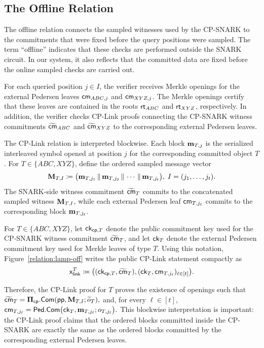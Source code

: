 \subsection{The Offline Relation}
\label{sec:openings-and-cplink}

The offline relation connects the sampled witnesses used by the
CP-SNARK to the commitments that were fixed before the query positions were
sampled.  The term ``offline'' indicates that these checks are performed outside the SNARK circuit. In our system, it also reflects that the committed data are fixed before the online sampled checks are carried out.

For each queried position \(j\in I\), the verifier receives Merkle openings for the external Pedersen leaves $\textsf{cm}_{ABC,j}$ and $\textsf{cm}_{XYZ,j}$.
The Merkle openings certify that these leaves are contained in the roots
\(\textsf{rt}_{ABC}\) and \(\textsf{rt}_{XYZ}\), respectively.  In addition, the verifier checks
CP-Link proofs connecting the CP-SNARK witness commitments
\(\widetilde{\textsf{cm}}_{ABC}\) and \(\widetilde{\textsf{cm}}_{XYZ}\) to the corresponding
external Pedersen leaves.

The CP-Link relation is interpreted blockwise.  Each block
\(\mathbf{m}_{T,j}\) is the serialized interleaved symbol opened at position
\(j\) for the corresponding committed object \(T\).  For
\(T\in\{ABC,XYZ\}\), define the ordered sampled message vector
\[
  \mathbf{M}_{T,I}
  \coloneqq
  \big(
    \mathbf{m}_{T,j_1}
    \,\|\,
    \mathbf{m}_{T,j_2}
    \,\|\,
    \cdots
    \,\|\,
    \mathbf{m}_{T,j_t}
  \big),
  \;
  I=(j_1,\ldots,j_t).
\]
The SNARK-side witness commitment \(\widetilde{\textsf{cm}}_{T}\) commits to the
concatenated sampled witness \(\mathbf{M}_{T,I}\), while each external Pedersen
leaf \(\textsf{cm}_{T,j_\ell}\) commits to the corresponding block
\(\mathbf{m}_{T,j_\ell}\).

\begin{revblock}
For \(T\in\{ABC,XYZ\}\), let \({\textsf{ck}}_{{\mathsf{cp}},T}\) denote the public commitment
key used for the CP-SNARK witness commitment \(\widetilde{\textsf{cm}}_{T}\), and let
\({\textsf{ck}}_T\) denote the external Pedersen commitment key used for Merkle leaves
of type \(T\). Using this notation, Figure~\ref{relation:lamp-off} writes the
public CP-Link statement compactly as
\[
  \mathsf{x}_{\mathsf{link}}^T
  \coloneqq
  \big(
    ({\textsf{ck}}_{{\mathsf{cp}},T},\widetilde{\textsf{cm}}_{T}),
    ({\textsf{ck}}_T,\textsf{cm}_{T,j_\ell})_{\ell\in[t]}
  \big).
\]
\end{revblock}
Therefore, the CP-Link proof for \(T\) proves the existence of openings such that
  $\widetilde{\textsf{cm}}_{T}
  =
  {\bf \Pi}_{{\mathsf{cp}}}.{\sf Com}(
    \textsf{pp},
    \mathbf{M}_{T,I};
    \widetilde{o}_{T}
  ),$
and, for every \(\ell\in[t]\),
  $\textsf{cm}_{T,j_\ell}
  =
  \textsf{Ped.Com}
  \big(
    {\textsf{ck}}_T,
    \mathbf{m}_{T,j_\ell};
    o_{T,j_\ell}
  \big).$
This blockwise interpretation is important: the CP-Link proof claims that the ordered blocks committed inside the CP-SNARK are exactly the same as the ordered blocks committed by the corresponding external Pedersen leaves.


